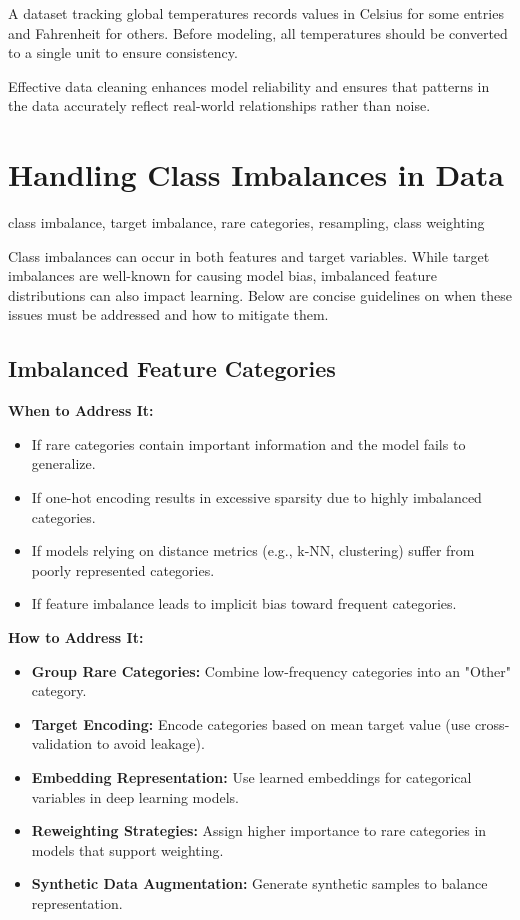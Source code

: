 \documentclass[12pt,openany]{book}
\begin{document}
\begin{examplebox}
A dataset tracking global temperatures records values in Celsius for some entries and Fahrenheit for others. Before modeling, all temperatures should be converted to a single unit to ensure consistency.
\end{examplebox}

Effective data cleaning enhances model reliability and ensures that patterns in the data accurately reflect real-world relationships rather than noise. \newline



\section{Handling Class Imbalances in Data}

\begin{keywordsbox}
class imbalance, target imbalance, rare categories, resampling, class weighting
\end{keywordsbox}


Class imbalances can occur in both features and target variables. While target imbalances are well-known for causing model bias, imbalanced feature distributions can also impact learning. Below are concise guidelines on when these issues must be addressed and how to mitigate them.

\subsection{Imbalanced Feature Categories}

\textbf{When to Address It:}
\begin{itemize}
    \item If rare categories contain important information and the model fails to generalize.
    \item If one-hot encoding results in excessive sparsity due to highly imbalanced categories.
    \item If models relying on distance metrics (e.g., k-NN, clustering) suffer from poorly represented categories.
    \item If feature imbalance leads to implicit bias toward frequent categories.
\end{itemize}

\textbf{How to Address It:}
\begin{itemize}
    \item \textbf{Group Rare Categories:} Combine low-frequency categories into an "Other" category.
    \item \textbf{Target Encoding:} Encode categories based on mean target value (use cross-validation to avoid leakage).
    \item \textbf{Embedding Representation:} Use learned embeddings for categorical variables in deep learning models.
    \item \textbf{Reweighting Strategies:} Assign higher importance to rare categories in models that support weighting.
    \item \textbf{Synthetic Data Augmentation:} Generate synthetic samples to balance representation.
\end{itemize}
\end{document}
